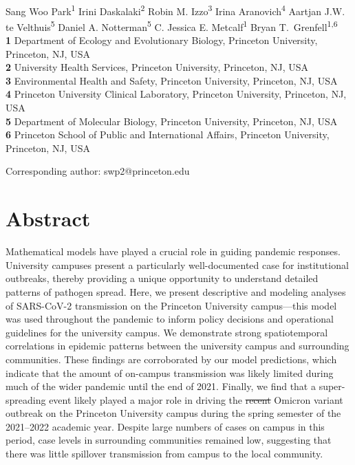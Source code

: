 \documentclass[12pt]{article}
\providecommand{\DIFaddtex}[1]{{\protect\color{blue}\uwave{#1}}} %
\providecommand{\DIFdeltex}[1]{{\protect\color{red}\sout{#1}}}                      %
\providecommand{\DIFaddbegin}{} %
\providecommand{\DIFaddend}{} %
\providecommand{\DIFdelbegin}{} %
\providecommand{\DIFdelend}{} %
\providecommand{\DIFadd}[1]{\texorpdfstring{\DIFaddtex{#1}}{#1}} %
\providecommand{\DIFdel}[1]{\texorpdfstring{\DIFdeltex{#1}}{}} %
\newcommand{\DIFscaledelfig}{0.5}
\newlength{\DIFdelgraphicswidth} %
\newlength{\DIFdelgraphicsheight} %
\newcommand{\DIFaddincludegraphics}[2][]{{\color{blue}\fbox{\DIFOincludegraphics[#1]{#2}}}} %
\newcommand{\DIFdelincludegraphics}[2][]{%
\sbox{\DIFdelgraphicsbox}{\DIFOincludegraphics[#1]{#2}}%
\settoboxwidth{\DIFdelgraphicswidth}{\DIFdelgraphicsbox} %
\settoboxtotalheight{\DIFdelgraphicsheight}{\DIFdelgraphicsbox} %
\scalebox{\DIFscaledelfig}{%
\parbox[b]{\DIFdelgraphicswidth}{\usebox{\DIFdelgraphicsbox}\\[-\baselineskip] \rule{\DIFdelgraphicswidth}{0em}}\llap{\resizebox{\DIFdelgraphicswidth}{\DIFdelgraphicsheight}{%
\setlength{\unitlength}{\DIFdelgraphicswidth}%
\begin{picture}(1,1)%
\thicklines\linethickness{2pt} %
{\color[rgb]{1,0,0}\put(0,0){\framebox(1,1){}}}%
{\color[rgb]{1,0,0}\put(0,0){\line( 1,1){1}}}%
{\color[rgb]{1,0,0}\put(0,1){\line(1,-1){1}}}%
\end{picture}%
}\hspace*{3pt}}} %
} %
\DeclareRobustCommand{\DIFaddbegin}{\DIFOaddbegin \let\includegraphics\DIFaddincludegraphics} %
\DeclareRobustCommand{\DIFaddend}{\DIFOaddend \let\includegraphics\DIFOincludegraphics} %
\DeclareRobustCommand{\DIFdelbegin}{\DIFOdelbegin \let\includegraphics\DIFdelincludegraphics} %
\DeclareRobustCommand{\DIFdelend}{\DIFOaddend \let\includegraphics\DIFOincludegraphics} %
\begin{document}
\begin{flushleft}{
	\Large
	\textbf{}
}
\newline
\\
Sang Woo Park\textsuperscript{1}
Irini Daskalaki\textsuperscript{2}
Robin M. Izzo\textsuperscript{3}
Irina Aranovich\textsuperscript{4}
Aartjan J.W. te Velthuis\textsuperscript{5}
Daniel A. Notterman\textsuperscript{5}
C. Jessica E. Metcalf\textsuperscript{1\DIFaddbegin \DIFadd{,6}\DIFaddend }
Bryan T.\ Grenfell\textsuperscript{1,6}
\\
\bigskip
\textbf{1} Department of Ecology and Evolutionary Biology, Princeton University, Princeton, NJ, USA
\\
\textbf{2} University Health Services, Princeton University, Princeton, NJ, USA
\\
\textbf{3} Environmental Health and Safety, Princeton University, Princeton, NJ, USA
\\
\textbf{4} Princeton University Clinical Laboratory, Princeton University, Princeton, NJ, USA
\\
\textbf{5} Department of Molecular Biology, Princeton University, Princeton, NJ, USA
\\
\textbf{6} Princeton School of Public and International Affairs, Princeton University, Princeton, NJ, USA
\\
\bigskip

Corresponding author: swp2@princeton.edu
\bigskip
\end{flushleft}

\section*{Abstract}

Mathematical models have played a crucial role in \DIFaddbegin \DIFadd{exploring and }\DIFaddend guiding pandemic responses. 
University campuses present a particularly well-documented case for institutional outbreaks, thereby providing a unique opportunity to understand detailed patterns of pathogen spread.
Here, we present descriptive and modeling analyses of SARS-CoV-2 transmission on the Princeton University campus---this model was used throughout the pandemic to inform policy decisions and operational guidelines for the university campus.
We demonstrate strong spatiotemporal correlations in epidemic patterns between the university campus and surrounding communities.
These findings are corroborated by our model predictions, which indicate that the amount of on-campus transmission was likely limited during much of the wider pandemic until the end of 2021.
Finally, we find that a super-spreading event likely played a major role in driving the \DIFdelbegin \DIFdel{recent }\DIFdelend Omicron variant outbreak on the Princeton University campus during the spring semester of the 2021--2022 academic year.
Despite large numbers of cases on campus in this period, case levels in surrounding communities remained low, suggesting that there was little spillover transmission from campus to the local community.
\end{document}
